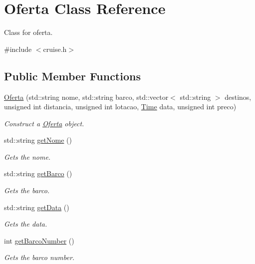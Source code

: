 \hypertarget{classOferta}{}\section{Oferta Class Reference}
\label{classOferta}


Class for oferta.  




{\ttfamily \#include $<$cruise.\+h$>$}

\subsection*{Public Member Functions}
\begin{DoxyCompactItemize}
\item 
\hyperlink{classOferta_a49a53f9d6ba51f97a3b428c8fac98d7f}{Oferta} (std\+::string nome, std\+::string barco, std\+::vector$<$ std\+::string $>$ destinos, unsigned int distancia, unsigned int lotacao, \hyperlink{classTime}{Time} data, unsigned int preco)
\begin{DoxyCompactList}\small\item\em Construct a \hyperlink{classOferta}{Oferta} object. \end{DoxyCompactList}\item 
std\+::string \hyperlink{classOferta_a16da38d9f369b000cb544c34200707b8}{get\+Nome} ()
\begin{DoxyCompactList}\small\item\em Gets the nome. \end{DoxyCompactList}\item 
std\+::string \hyperlink{classOferta_aaed9b5937f9f33d2980fcc13ac02132c}{get\+Barco} ()
\begin{DoxyCompactList}\small\item\em Gets the barco. \end{DoxyCompactList}\item 
std\+::string \hyperlink{classOferta_a2b156b75371ad59af54ad96ad79c9d1e}{get\+Data} ()
\begin{DoxyCompactList}\small\item\em Gets the data. \end{DoxyCompactList}\item 
int \hyperlink{classOferta_abf0f062fa730edf6d4232926980b106c}{get\+Barco\+Number} ()
\begin{DoxyCompactList}\small\item\em Gets the barco number. \end{DoxyCompactList}\item 

\end{DoxyCompactItemize}
